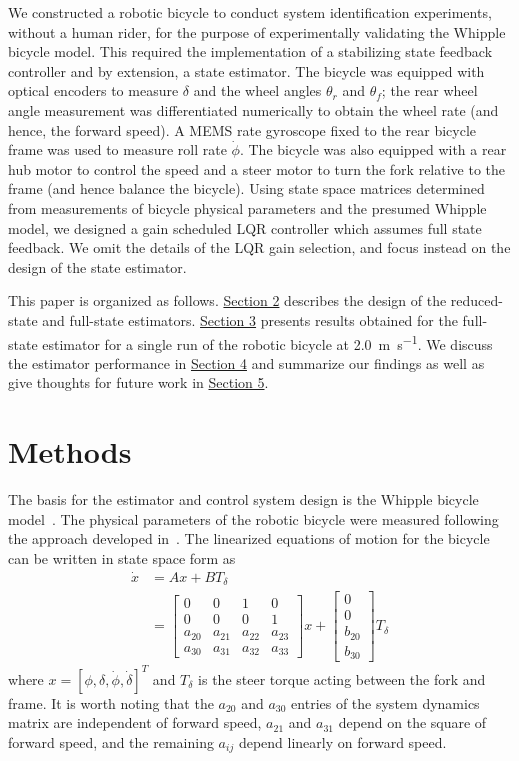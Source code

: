 \documentclass[letterpaper,11pt]{article}
\begin{document}
We constructed a robotic bicycle to conduct system identification experiments,
without a human rider, for the purpose of experimentally validating the Whipple
bicycle model. This required the implementation of a stabilizing state feedback
controller and by extension, a state estimator. The bicycle was equipped with
optical encoders to measure $\delta$ and the wheel angles $\theta_r$ and
$\theta_f$; the rear wheel angle measurement was differentiated numerically to
obtain the wheel rate (and hence, the forward speed). A MEMS rate gyroscope
fixed to the rear bicycle frame was used to measure roll rate $\dot{\phi}$. The
bicycle was also equipped with a rear hub motor to control the speed and a
steer motor to turn the fork relative to the frame (and hence balance the
bicycle). Using state space matrices determined from measurements of bicycle
physical parameters and the presumed Whipple model, we designed a gain
scheduled LQR controller which assumes full state feedback. We omit the details
of the LQR gain selection, and focus instead on the design of the state
estimator.

This paper is organized as follows. \hyperref[sec:methods]{Section 2} describes
the design of the reduced-state and full-state estimators.
\hyperref[sec:results]{Section 3} presents results obtained for the full-state
estimator for a single run of the robotic bicycle at \SI{2.0}{\m\per\s}. We
discuss the estimator performance in \hyperref[sec:discussion]{Section 4} and
summarize our findings as well as give thoughts for future work in
\hyperref[sec:conclusion]{Section 5}.

\section{Methods} \label{sec:methods}
The basis for the estimator and control system design is the Whipple bicycle
model~\cite{Whipple1899}. The physical parameters of the robotic bicycle were
measured following the approach developed in~\cite{Moore2010b}.  The linearized
equations of motion for the bicycle can be written in state space form as
\begin{align*}
  \dot{x} &= A x + B T_\delta \\
          &= \left[\begin{smallmatrix}0 & 0 & 1 & 0\\0 & 0 & 0 & 1\\a_{20} & a_{21} &
a_{22} & a_{23}\\a_{30} & a_{31} & a_{32} & a_{33}\end{smallmatrix}\right] x +
\left[\begin{smallmatrix}0\\0\\b_{20}\\b_{30}\end{smallmatrix}\right] T_\delta
\end{align*}
where $x = \left[\phi, \delta, \dot{\phi}, \dot{\delta}\right]^T$ and
$T_\delta$ is the steer torque acting between the fork and frame. It is
worth noting that the $a_{20}$ and $a_{30}$ entries of the system dynamics
matrix are independent of forward speed, $a_{21}$ and $a_{31}$ depend on the
square of forward speed, and the remaining $a_{ij}$ depend linearly on forward
speed.
\end{document}
